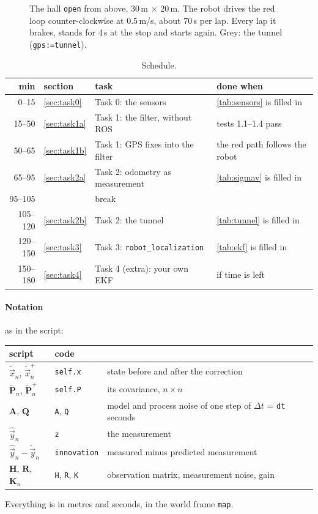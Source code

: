 \documentclass[11pt,a4paper,parskip=half]{scrartcl}
\newcommand{\thema}[1]{\texttt{#1}}
\newcommand{\mat}[1]{\mathbf{#1}}
\begin{document}
\begin{figure}[ht]
  \centering
  
  \caption{The hall \thema{open} from above, 30\,m \(\times\) 20\,m. The robot drives the red loop
    counter-clockwise at 0.5\,m/s, about 70\,s per lap. Every lap it brakes, stands for 4\,s at the stop and
    starts again. Grey: the tunnel (\thema{gps:=tunnel}).}
  \label{fig:field}
\end{figure}

\begin{table}[ht]\centering
\caption{Schedule.}
\label{tab:schedule}
\begin{tabular}{@{}rlll@{}}
\toprule
min & section & task & done when \\
\midrule
0--15 & \ref{sec:task0} & Task 0: the sensors & \cref{tab:sensors} is filled in \\
15--50 & \ref{sec:task1a} & Task 1: the filter, without ROS & tests 1.1--1.4 pass \\
50--65 & \ref{sec:task1b} & Task 1: GPS fixes into the filter & the red path follows the robot \\
65--95 & \ref{sec:task2a} & Task 2: odometry as measurement & \cref{tab:sigmav} is filled in \\
95--105 & & break & \\
105--120 & \ref{sec:task2b} & Task 2: the tunnel & \cref{tab:tunnel} is filled in \\
120--150 & \ref{sec:task3} & Task 3: \thema{robot\_localization} & \cref{tab:ekf} is filled in \\
150--180 & \ref{sec:task4} & Task 4 (extra): your own EKF & if time is left \\
\bottomrule
\end{tabular}
\end{table}

\paragraph{Notation} as in the script:
\begin{center}\small
\begin{tabular}{@{}lll@{}}
\toprule
script & code & \\
\midrule
\(\tilde{\vec x}_n\), \(\tilde{\vec x}_n^+\) & \thema{self.x} & state before and after the correction \\
\(\tilde{\mat P}_n\), \(\tilde{\mat P}_n^+\) & \thema{self.P} & its covariance, \(n \times n\) \\
\(\mat A\), \(\mat Q\) & \thema{A}, \thema{Q} & model and process noise of one step of \(\Delta t\) = \thema{dt} seconds \\
\(\hat{\vec y}_n\) & \thema{z} & the measurement \\
\(\hat{\vec y}_n - \tilde{\vec y}_n\) & \thema{innovation} & measured minus predicted measurement \\
\(\mat H\), \(\mat R\), \(\mat K_n\) & \thema{H}, \thema{R}, \thema{K} & observation matrix, measurement noise, gain \\
\bottomrule
\end{tabular}
\end{center}
Everything is in metres and seconds, in the world frame \thema{map}.
\end{document}
